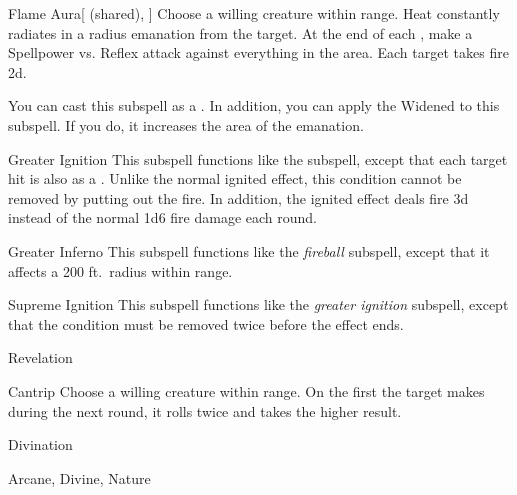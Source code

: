 \begin{ability}[\nth{6}]{Flame Aura}[ (shared), ]
Choose a willing creature within \rngclose range.
Heat constantly radiates in a \areamed radius emanation from the target.
At the end of each , make a Spellpower vs. Reflex attack against everything in the area.
\hit Each target takes fire  \minus2d.

You can cast this subspell as a .
In addition, you can apply the Widened  to this subspell.
If you do, it increases the area of the emanation.
\end{ability}
\vspace{0.25em}


\begin{ability}[\nth{6}]{Greater Ignition}
This subspell functions like the  subspell, except that each target hit is also  as a .
Unlike the normal ignited effect, this condition cannot be removed by putting out the fire.
In addition, the ignited effect deals fire  \minus3d instead of the normal 1d6 fire damage each round.
\end{ability}
\vspace{0.25em}


\begin{ability}[\nth{9}]{Greater Inferno}
This subspell functions like the \textit{fireball} subspell, except that it affects a 200 ft.\ radius within \rnglong range.
\end{ability}
\vspace{0.25em}


\begin{ability}[\nth{9}]{Supreme Ignition}
This subspell functions like the \textit{greater ignition} subspell, except that the condition must be removed twice before the effect ends.
\end{ability}
\vspace{0.25em}

\newpage
\begin{spellsection}{Revelation}

\begin{spellheader}
\end{spellheader}


\begin{ability}{Cantrip}
Choose a willing creature within \rngclose range.
On the first  the target makes during the next round, it rolls twice and takes the higher result.
\end{ability}




 Divination

 Arcane, Divine, Nature
\end{spellsection}


